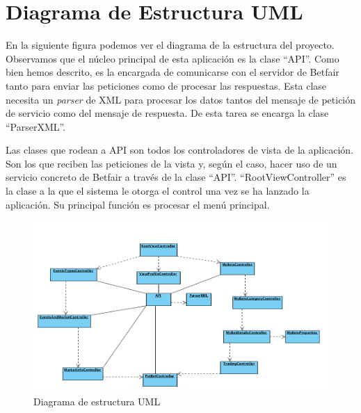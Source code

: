 \section{Diagrama de Estructura UML}
 En la siguiente figura podemos ver el diagrama de la estructura del proyecto. Observamos que el núcleo principal de esta aplicación es la clase ``API''. Como bien hemos descrito, es la encargada de comunicarse con el servidor de Betfair tanto para enviar las peticiones como de procesar las respuestas. Esta clase necesita un \emph{parser} de XML para procesar los datos tantos del mensaje de petición de servicio como del mensaje de respuesta. De esta tarea se encarga la clase ``ParserXML''.
 
  Las clases que rodean a API son todos los controladores de vista de la aplicación. Son los que reciben las peticiones de la vista y, según el caso, hacer uso de un servicio concreto de Betfair a través de la clase ``API''. ``RootViewController'' es la clase a la que el sistema le otorga el control una vez se ha lanzado la aplicación. Su principal función es procesar el menú principal.

 \begin{figure}[h!]
    \centering
       \includegraphics[width=1.2\textwidth]{./images/UML_Diagram.png}
     \caption{Diagrama de estructura UML}
   \label{fig:Diagrama de estructura UML}
\end{figure}

